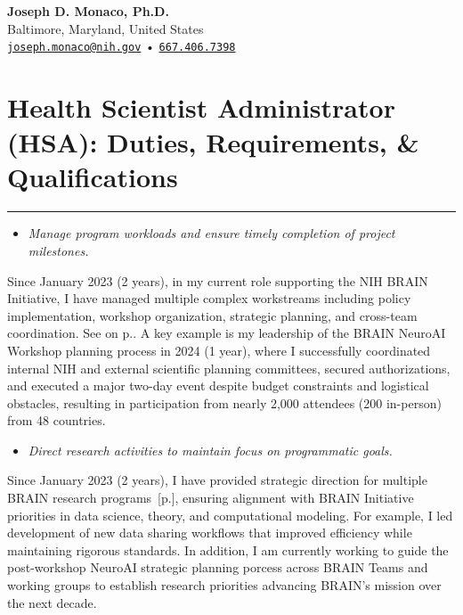 \documentclass[10pt]{article}
\newcommand{\see}[1]{[\textcolor{hopkinsblue}{p.\pageref{sec:#1}}]}
\newcommand{\cf}[1]{\textcolor{hopkinsblue}{See \emph{\nameref{sec:#1}} on p.\pageref{sec:#1}}}
\newcommand{\newsection}[2]{%
  \section*{#1}
  \vspace{-.1in}
  \hrule
  \vspace{.2in}
  \label{sec:#2}
}
\begin{document}
\begin{center}
  \textbf{\LARGE\color{hopkinsblue} Joseph D. Monaco, Ph.D.} \\[0.1in]
  Baltimore, Maryland, United States \\
  \href{mailto:joseph.monaco@nih.gov}{\color{hopkinsblue}\texttt{joseph.monaco@nih.gov}} •
  \href{tel:16674067398}{\color{hopkinsblue}\texttt{667.406.7398}} \\
  \vspace{.1in}
\end{center}

\vspace{-0.1in}
\newsection{Health Scientist Administrator (HSA): Duties, Requirements, \& Qualifications}{duties}
\vspace{-0.1in}

\begin{itemize}
  \color{hopkinsblue}
  \item \emph{Manage program workloads and ensure timely completion of project
milestones.}
\end{itemize}

Since January 2023 (2 years), in my current role supporting the NIH BRAIN
Initiative, I have managed multiple complex workstreams including policy
implementation, workshop organization, strategic planning, and cross-team
coordination. \cf{jobobd}. A key example is my leadership of the BRAIN
NeuroAI Workshop planning process in 2024 (1 year), where I successfully
coordinated internal NIH and external scientific planning committees, secured
authorizations, and executed a major two-day event despite budget constraints
and logistical obstacles, resulting in participation from nearly 2,000 attendees
(200 in-person) from 48 countries.

\begin{itemize}
  \color{hopkinsblue}
  \item \emph{Direct research activities to maintain focus on programmatic
goals.}
\end{itemize}

Since January 2023 (2 years), I have provided strategic direction for multiple
BRAIN research programs~\see{jobobd}, ensuring alignment with BRAIN Initiative
priorities in data science, theory, and computational modeling. For example, I
led development of new data sharing workflows that improved efficiency while
maintaining rigorous standards. In addition, I am currently working to guide the
post-workshop NeuroAI strategic planning porcess across BRAIN Teams and working
groups to establish research priorities advancing BRAIN's mission over the next
decade.
\end{document}

